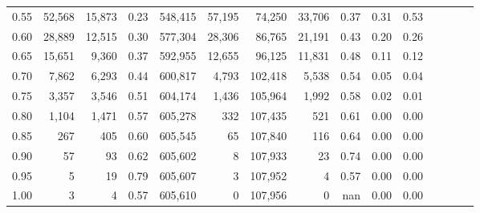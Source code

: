 \begin{tabular}{rrrcrrrrrrrrrrr}
0.55 &   52,568 &  15,873 &                                       0.23 &  548,415 &   57,195 &   74,250 &   33,706 &  0.37 &  0.31 &                         0.53 \\
0.60 &   28,889 &  12,515 &                                       0.30 &  577,304 &   28,306 &   86,765 &   21,191 &  0.43 &  0.20 &                         0.26 \\
0.65 &   15,651 &   9,360 &                                       0.37 &  592,955 &   12,655 &   96,125 &   11,831 &  0.48 &  0.11 &                         0.12 \\
0.70 &    7,862 &   6,293 &                                       0.44 &  600,817 &    4,793 &  102,418 &    5,538 &  0.54 &  0.05 &                         0.04 \\
0.75 &    3,357 &   3,546 &                                       0.51 &  604,174 &    1,436 &  105,964 &    1,992 &  0.58 &  0.02 &                         0.01 \\
0.80 &    1,104 &   1,471 &                                       0.57 &  605,278 &      332 &  107,435 &      521 &  0.61 &  0.00 &                         0.00 \\
0.85 &      267 &     405 &                                       0.60 &  605,545 &       65 &  107,840 &      116 &  0.64 &  0.00 &                         0.00 \\
0.90 &       57 &      93 &                                       0.62 &  605,602 &        8 &  107,933 &       23 &  0.74 &  0.00 &                         0.00 \\
0.95 &        5 &      19 &                                       0.79 &  605,607 &        3 &  107,952 &        4 &  0.57 &  0.00 &                         0.00 \\
1.00 &        3 &       4 &                                       0.57 &  605,610 &        0 &  107,956 &        0 &   nan &  0.00 &                         0.00 \\
\bottomrule
\end{tabular}
